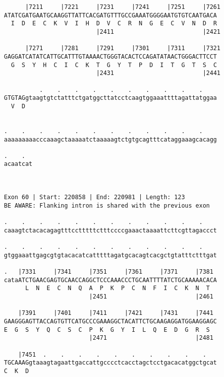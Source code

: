 \documentclass{article}
\begin{document}
\begin{Verbatim}
      |7211     |7221     |7231     |7241     |7251     |7261
ATATCGATGAATGCAAGGTTATTCACGATGTTTGCCGAAATGGGGAATGTGTCAATGACA
  I  D  E  C  K  V  I  H  D  V  C  R  N  G  E  C  V  N  D  R
                          |2411                         |2421
  
      |7271     |7281     |7291     |7301     |7311     |7321
GAGGATCATATCATTGCATTTGTAAAACTGGGTACACTCCAGATATAACTGGGACTTCCT
  G  S  Y  H  C  I  C  K  T  G  Y  T  P  D  I  T  G  T  S  C
                          |2431                         |2441
  
          .    .    .    .    .    .    .    .    .    .    
GTGTAGgtaagtgtctatttctgatggcttatcctcaagtggaaattttagattatggaa
  V  D                                                      
                                                            
  
.    .    .    .    .    .    .    .    .    .    .    .    
aaaaaaaaacccaaagctaaaaatctaaaaagtctgtgcagtttcataggaaagcacagg
                                                            
.    .  
acaatcat
        
        
 
Exon 60 | Start: 220858 | End: 220981 | Length: 123
BE AWARE: Flanking intron is shared with the previous exon
 
.    .    .    .    .    .    .    .    .    .    .    .    
caaagtctacacagagtttcctttttctttccccgaaactaaaattcttcgttagaccct
                                                            
.    .    .    .    .    .    .    .    .    .    .    .    
gtggaaattgagcgtgtacacatcatttttagatgcacagtcacgctgtatttctttgat
                                                            
.   |7331     |7341     |7351     |7361     |7371     |7381 
cataATCTGAACGAGTGCAACCAGGCTCCCAAACCCTGCAATTTTATCTGCAAAAACACA
      L  N  E  C  N  Q  A  P  K  P  C  N  F  I  C  K  N  T  
                        |2451                         |2461 
  
    |7391     |7401     |7411     |7421     |7431     |7441 
GAAGGGAGTTACCAGTGTTCATGCCCGAAAGGCTACATTCTGCAAGAGGATGGAAGGAGC
E  G  S  Y  Q  C  S  C  P  K  G  Y  I  L  Q  E  D  G  R  S  
                        |2471                         |2481 
  
    |7451  .    .    .    .    .    .    .    .    .    .   
TGCAAAGgtaaagtagaattgaccattgcccctcacctagctcctgacacatggctgcat
C  K  D                                                     
                                                            

\end{Verbatim}
\end{document}
